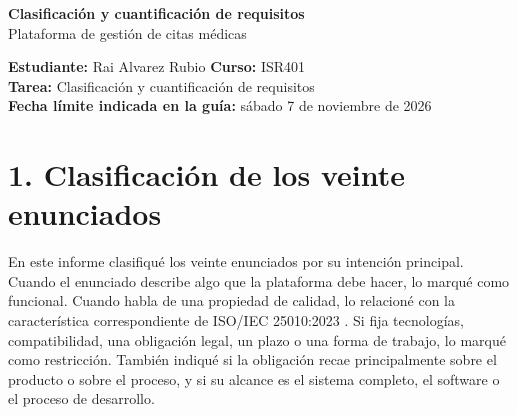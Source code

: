 \documentclass[10pt,letterpaper,landscape]{article}
\begin{document}
\begin{center}
{\Large\bfseries\color{azul} Clasificación y cuantificación de requisitos}\\
{\large Plataforma de gestión de citas médicas}
\end{center}

\textbf{Estudiante:} Rai Alvarez Rubio \hfill
\textbf{Curso:} ISR401\\
\textbf{Tarea:} Clasificación y cuantificación de requisitos\\
\textbf{Fecha límite indicada en la guía:} sábado 7 de noviembre de 2026

\section*{1. Clasificación de los veinte enunciados}

En este informe clasifiqué los veinte enunciados por su intención principal. Cuando el enunciado describe algo que la plataforma debe hacer, lo marqué como funcional. Cuando habla de una propiedad de calidad, lo relacioné con la característica correspondiente de ISO/IEC 25010:2023 \cite{iso25010}. Si fija tecnologías, compatibilidad, una obligación legal, un plazo o una forma de trabajo, lo marqué como restricción. También indiqué si la obligación recae principalmente sobre el producto o sobre el proceso, y si su alcance es el sistema completo, el software o el proceso de desarrollo.
\end{document}
